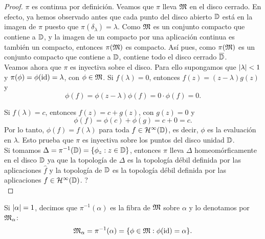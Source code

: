 
\begin{proof}
$\pi$ es continua por definición. Veamos que $\pi$ lleva $\mathfrak{M}$ en el disco cerrado. En efecto, ya hemos observado antes que cada punto del disco abierto $\mathbb{D}$ está en la imagen de $\pi$ puesto que $\pi (\delta_\lambda) = \lambda$. Como $\mathfrak{M}$ es un conjunto compacto que contiene a $\mathbb{D}$, y la imagen de un compacto por una aplicación continua es también un compacto, entonces $\pi(\mathfrak{M})$ es compacto. Así pues, como $\pi(\mathfrak{M})$ es un conjunto compacto que contiene a $\mathbb{D}$, contiene todo el disco cerrado $\overline{\mathbb{D}}$. \\

Veamos ahora que $\pi$ es inyectiva sobre el disco. Para ello supongamos que $\left\lvert\lambda\right\rvert < 1$ y $\pi (\phi) = \phi (\operatorname{id}) = \lambda$, con $\phi \in \mathfrak{M}$. Si $f(\lambda) = 0$, entonces $f(z) = (z - \lambda) g(z)$ y
\begin{equation*}
    \phi(f) = \phi(z - \lambda) \phi(f) = 0 \cdot \phi(f) = 0.
\end{equation*}

Si $f(\lambda) = c$, entonces $f(z) = c + g(z)$, con $g(z) = 0$ y
\begin{equation*}
    \phi(f) = \phi(c) + \phi(g) = c + 0 = c.
\end{equation*}
Por lo tanto, $\phi(f) = f(\lambda)$ para toda $f \in \mathcal{H}^{\infty}(\mathbb{D})$, es decir, $\phi$ es la evaluación en $\lambda$. Esto prueba que $\pi$ es inyectiva sobre los puntos del disco unidad $\mathbb{D}$. \\

Si tomamos $\Delta = \pi^{-1} (\mathbb{D}) = \{\phi_z : z \in \mathbb{D}\}$, entonces $\pi$ lleva $\Delta$ homeomórficamente en el disco $\mathbb{D}$ ya que la topología de $\Delta$ es la topología débil definida por las aplicaciones $\widehat f$ y la topología de $\mathbb{D}$ es la topología débil definida por las aplicaciones $f \in \mathcal{H}^{\infty}(\mathbb{D})$. ?\\
\end{proof}

Si $\left\lvert\alpha\right\rvert = 1$, decimos que $\pi^{-1} (\alpha)$ es la fibra de $\mathfrak{M}$ sobre $\alpha$ y lo denotamos por $\mathfrak{M}_\alpha$:
\begin{equation*}
    \mathfrak{M}_\alpha = \pi^{-1} (\alpha) = \{\phi \in \mathfrak{M} : \phi (\operatorname{id}) = \alpha\}.
\end{equation*}

